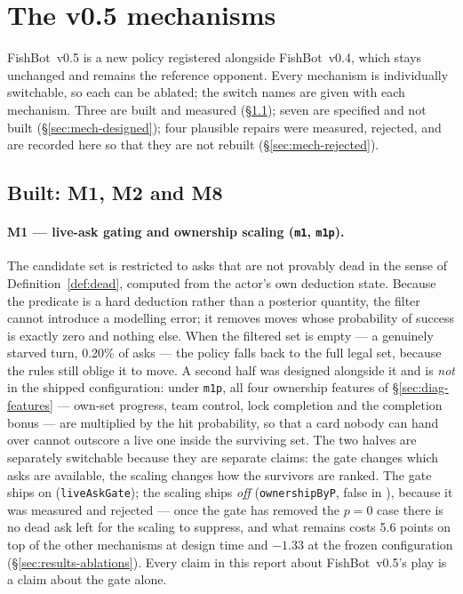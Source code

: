 \documentclass[11pt]{article}
\theoremstyle{definition}
\DeclareRobustCommand{\vfive}{\texorpdfstring{\mbox{FishBot v0.5}}{FishBot v0.5}}
\DeclareRobustCommand{\vfour}{\texorpdfstring{\mbox{FishBot v0.4}}{FishBot v0.4}}
\providecommand{\numStarved}{0.20}
\providecommand{\numAblOwnershipPDelta}{-1.33}
\providecommand{\numMonePReject}{5.6}
\begin{document}
\section{The v0.5 mechanisms}
\label{sec:mechanisms}

\vfive{} is a new policy registered alongside \vfour{}, which stays unchanged and
remains the reference opponent. Every mechanism is individually switchable, so
each can be ablated; the switch names are given with each mechanism. Three are
built and measured (\S\ref{sec:mech-built}); seven are specified and not built
(\S\ref{sec:mech-designed}); four plausible repairs were measured, rejected, and
are recorded here so that they are not rebuilt (\S\ref{sec:mech-rejected}).

\subsection{Built: M1, M2 and M8}
\label{sec:mech-built}

\paragraph{M1 --- live-ask gating and ownership scaling (\texttt{m1}, \texttt{m1p}).}
The candidate set is restricted to asks that are not provably dead in the sense of
Definition~\ref{def:dead}, computed from the actor's own deduction state. Because
the predicate is a hard deduction rather than a posterior quantity, the filter
cannot introduce a modelling error; it removes moves whose probability of success
is exactly zero and nothing else. When the filtered set is empty --- a genuinely
starved turn, \numStarved\% of asks --- the policy falls back to the full legal
set, because the rules still oblige it to move. A second half was designed
alongside it and is \emph{not} in the shipped configuration: under \texttt{m1p},
all four ownership features of \S\ref{sec:diag-features} --- own-set progress,
team control, lock completion and the completion bonus --- are multiplied by the
hit probability, so that a card nobody can hand over cannot outscore a live one
inside the surviving set. The two halves are separately switchable because they
are separate claims: the gate changes which asks are available, the scaling
changes how the survivors are ranked. The gate ships on
(\texttt{liveAskGate}); the scaling ships \emph{off}
(\texttt{ownershipByP}, false in ), because it was
measured and rejected --- once the gate has removed the $p = 0$ case there is no
dead ask left for the scaling to suppress, and what remains costs
\numMonePReject{} points on top of the other mechanisms at design time and
$\numAblOwnershipPDelta$ at the frozen configuration
(\S\ref{sec:results-ablations}). Every claim in this report about \vfive{}'s play
is a claim about the gate alone.
\end{document}
